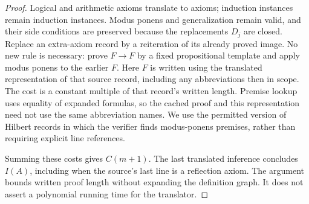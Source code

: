 \documentclass[11pt]{article}
\theoremstyle{remark}
\begin{document}
\begin{proof}
Logical and arithmetic axioms translate to axioms; induction instances remain
induction instances. Modus ponens and generalization remain valid, and their
side conditions are preserved because the replacements $D_j$ are closed.
Replace an extra-axiom record by a reiteration of its already proved image.
No new rule is necessary: prove $F\to F$ by a fixed propositional template
and apply modus ponens to the earlier $F$. Here $F$ is written using the
translated representation of that source record, including any abbreviations
then in scope. The cost is a constant multiple of that record's written
length. Premise lookup uses equality of expanded formulas, so the cached
proof and this representation need not use the same abbreviation names.
We use the permitted version of Hilbert records in which the verifier finds
modus-ponens premises, rather than requiring explicit line references.

Summing these costs gives $C(m+1)$. The last translated inference concludes
$I(A)$, including when the source's last line is a reflection axiom. The
argument bounds written proof length without expanding the definition graph.
It does not assert a polynomial running time for the translator.
\end{proof}
\end{document}
